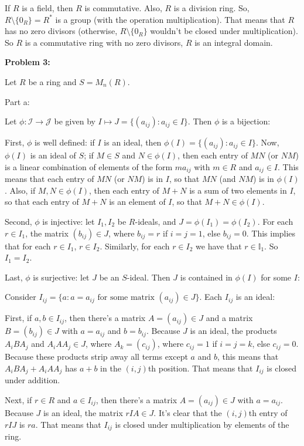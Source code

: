 \documentclass[a4paper,12pt]{article}
\newcommand{\tab}{\hspace{4mm}} %
\newcommand{\shunt}{\vspace{20mm}}
\newcommand{\I}{\mathbb{I}}
\newcommand{\scrI}{\mathcal{I}}
\newcommand{\scrJ}{\mathcal{J}}
\begin{document}
If $R$ is a field, then $R$ is commutative. Also, $R$ is a division ring. So, $R \setminus \{0_R\} = R^*$ is a group (with the operation multiplication). That means that $R$ has no zero divisors (otherwise, $R \setminus \{0_R\}$ wouldn't be closed under multiplication). So $R$ is a commutative ring with no zero divisors, $R$ is an integral domain.

\shunt

{\bf Problem 3:} %

Let $R$ be a ring and $S=M_n(R)$.

Part a:

Let $\phi: \scrI \to \scrJ$ be given by $I \mapsto J=\{(a_{ij}) : a_{ij} \in I\}$. Then $\phi$ is a bijection:

First, $\phi$ is well defined: if $I$ is an ideal, then $\phi(I) = \{(a_{ij}) : a_{ij} \in I\}$. Now, $\phi(I)$ is an ideal of $S$; if $M \in S$ and $N \in \phi(I)$, then each entry of $MN$ (or $NM$) is a linear combination of elements of the form $ma_{ij}$ with $m \in R$ and $a_{ij} \in I$. This means that each entry of $MN$ (or $NM$) is in $I$, so that $MN$ (and $NM$) is in $\phi(I)$. Also, if $M,N \in \phi(I)$, then each entry of $M+N$ is a sum of two elements in $I$, so that each entry of $M+N$ is an element of $I$, so that $M+N \in \phi(I)$.

Second, $\phi$ is injective: let $I_1,I_2$ be $R$-ideals, and $J=\phi(I_1)=\phi(I_2)$. For each $r \in I_1$, the matrix $(b_{ij}) \in J$, where $b_{ij} = r$ if $i=j=1$, else $b_{ij}=0$. This implies that for each $r \in I_1$, $r \in I_2$. Similarly, for each $r \in I_2$ we have that $r \in \I_1$. So $I_1 = I_2$. 

Last, $\phi$ is surjective: let $J$ be an $S$-ideal. Then $J$ is contained in $\phi(I)$ for some $I$:

\tab Consider $I_{ij}=\{a: a=a_{ij} \text{ for some matrix } (a_{ij}) \in J\}$. Each $I_{ij}$ is an ideal: 

\tab \tab First, if $a, b \in I_{ij}$, then there's a matrix $A=(a_{ij}) \in J$ and a matrix $B=(b_{ij}) \in J$ with $a=a_{ij}$ and $b=b_{ij}$. Because $J$ is an ideal, the products $A_iBA_j$ and $A_iAA_j \in J$, where $A_k = (c_{ij})$, where $c_{ij}=1$ if $i=j=k$, else $c_{ij}=0$. Because these products strip away all terms except $a$ and $b$, this means that $A_iBA_j + A_iAA_j$ has $a+b$ in the $(i,j)$th position. That means that $I_{ij}$ is closed under addition.

\tab \tab Next, if $r \in R$ and $a \in I_{ij}$, then there's a matrix $A=(a_{ij}) \in J$ with $a=a_{ij}$. Because $J$ is an ideal, the matrix $rIA \in J$. It's clear that the $(i,j)$th entry of $rIJ$ is $ra$. That means that $I_{ij}$ is closed under multiplication by elements of the ring.
\end{document}
